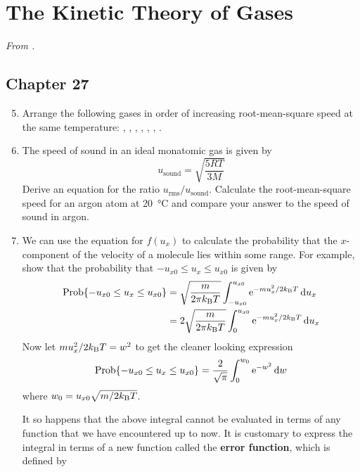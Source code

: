 \documentclass[../psets.tex]{subfiles}
\begin{document}
\section{The Kinetic Theory of Gases}
\emph{From \textcite{bib:McQuarrieSimon}.}
\subsection*{Chapter 27}
\begin{enumerate}[label={\textbf{27-\arabic*.}},leftmargin=3.5em]
    \setcounter{enumi}{4}
    \item Arrange the following gases in order of increasing root-mean-square speed at the same temperature: , , , , , , .
    \item The speed of sound in an ideal monatomic gas is given by
    \begin{equation*}
        u_\text{sound} = \sqrt{\frac{5RT}{3M}}
    \end{equation*}
    Derive an equation for the ratio $u_\text{rms}/u_\text{sound}$. Calculate the root-mean-square speed for an argon atom at \SI{20}{\celsius} and compare your answer to the speed of sound in argon.
    \setcounter{enumi}{11}
    \item We can use the equation for $f(u_x)$ to calculate the probability that the $x$-component of the velocity of a molecule lies within some range. For example, show that the probability that $-u_{x0}\leq u_x\leq u_{x0}$ is given by
    \begin{align*}
        \Prob\{-u_{x0}\leq u_x\leq u_{x0}\} &= \sqrt{\frac{m}{2\pi\kB T}}\int_{-u_{x0}}^{u_{x0}}\e[-mu_x^2/2\kB T]\dd{u_x}\\
        &= 2\sqrt{\frac{m}{2\pi\kB T}}\int_0^{u_{x0}}\e[-mu_x^2/2\kB T]\dd{u_x}
    \end{align*}
    Now let $mu_x^2/2\kB T=w^2$ to get the cleaner looking expression
    \begin{equation*}
        \Prob\{-u_{x0}\leq u_x\leq u_{x0}\} = \frac{2}{\sqrt{\pi}}\int_0^{w_0}\e[-w^2]\dd{w}
    \end{equation*}
    where $w_0=u_{x0}\sqrt{m/2\kB T}$.\par
    It so happens that the above integral cannot be evaluated in terms of any function that we have encountered up to now. It is customary to express the integral in terms of a new function called the \textbf{error function}, which is defined by
    \begin{equation*}

\end{equation*}
\end{enumerate}
\end{document}
